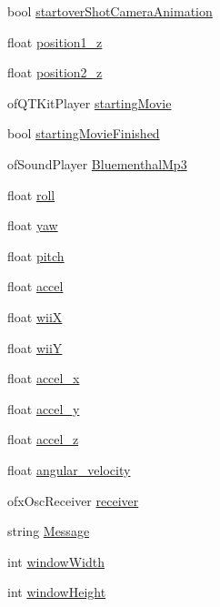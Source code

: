 \begin{DoxyCompactItemize}
\item 
bool \hyperlink{classtest_app_ad2fca6ce5e37462cd820afc48633324d}{startover\-Shot\-Camera\-Animation}
\item 
float \hyperlink{classtest_app_a808376783cdf510335cd1b37026e9bb3}{position1\-\_\-z}
\item 
float \hyperlink{classtest_app_a0720011cfaade6388109232ea4927c19}{position2\-\_\-z}
\item 
of\-Q\-T\-Kit\-Player \hyperlink{classtest_app_a9bfe7793fa0689a991ff64174745c38f}{starting\-Movie}
\item 
bool \hyperlink{classtest_app_aea3cb9f5f0061a42a4953d6b6c949036}{starting\-Movie\-Finished}
\item 
of\-Sound\-Player \hyperlink{classtest_app_af696fd13ee9ecb38ac0ba0b72543ce06}{Bluementhal\-Mp3}
\item 
float \hyperlink{classtest_app_a020730abb55e6ae6d0a28edee19050e0}{roll}
\item 
float \hyperlink{classtest_app_a865985f78dd5def3ed20c87b9fc772b6}{yaw}
\item 
float \hyperlink{classtest_app_aabbebeb113838374f659e86a0355b260}{pitch}
\item 
float \hyperlink{classtest_app_a8e560e923c82d421857538e4a5927542}{accel}
\item 
float \hyperlink{classtest_app_a7a77e8633c3a94e3e409a33a5cd9ae3f}{wii\-X}
\item 
float \hyperlink{classtest_app_a5ae41896388ae16ee530beca5333e02a}{wii\-Y}
\item 
float \hyperlink{classtest_app_ad1738ff98d225f80b853a9ddc9f5a116}{accel\-\_\-x}
\item 
float \hyperlink{classtest_app_a204bcb2412a70a65ebea6008ee8c4eb0}{accel\-\_\-y}
\item 
float \hyperlink{classtest_app_a61dbdd5c0b868568dde40a52f6e56054}{accel\-\_\-z}
\item 
float \hyperlink{classtest_app_a98e05c3206ff95fccfebfc9df5317598}{angular\-\_\-velocity}
\item 
ofx\-Osc\-Receiver \hyperlink{classtest_app_a034c44ff60fa1e5f021e90d5410ba657}{receiver}
\item 
string \hyperlink{classtest_app_a0124035d0454fb6bd9152f8a87c40677}{Message}
\item 
int \hyperlink{classtest_app_a9ed611377cd46f5148a3a3d538e96484}{window\-Width}
\item 
int \hyperlink{classtest_app_a4e8884eeef5b2657b62278969d4e3dcf}{window\-Height}
\item 

\end{DoxyCompactItemize}
